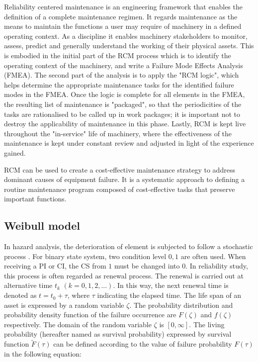 Reliability centered maintenance is an engineering framework that enables the definition of a complete maintenance regimen. It regards maintenance as the means to maintain the functions a user may require of machinery in a defined operating context. As a discipline it enables machinery stakeholders to monitor, assess, predict and generally understand the working of their physical assets. This is embodied in the initial part of the RCM process which is to identify the operating context of the machinery, and write a Failure Mode Effects Analysis (FMEA). The second part of the analysis is to apply the "RCM logic", which helps determine the appropriate maintenance tasks for the identified failure modes in the FMEA. Once the logic is complete for all elements in the FMEA, the resulting list of maintenance is "packaged", so that the periodicities of the tasks are rationalised to be called up in work packages; it is important not to destroy the applicability of maintenance in this phase. Lastly, RCM is kept live throughout the "in-service" life of machinery, where the effectiveness of the maintenance is kept under constant review and adjusted in light of the experience gained.

RCM can be used to create a cost-effective maintenance strategy to address dominant causes of equipment failure. It is a systematic approach to defining a routine maintenance program composed of cost-effective tasks that preserve important functions.









\subsection{Weibull model} \label{ch03:weibullmodel}

In hazard analysis, the deterioration of element is subjected to follow a stochastic process \cite{lancaster90}. For binary state system, two condition level $0, 1$ are often used. When receiving a PI or CI, the CS from $1$ must be changed into $0$. In reliability study, this process is often regarded as renewal process. The renewal is carried out at alternative time $t_k$ $(k=0,1,2,...)$. In this way, the next renewal time is denoted as $t=t_0+\tau$, where $\tau$ indicating the elapsed time. The life span of an asset is expressed by a random variable $\zeta$. The probability distribution and probability density function of the failure occurrence are $F(\zeta)$ and $f(\zeta)$ respectively. The domain of the random variable $\zeta$ is $[0,\infty]$. The living probability (hereafter named as survival probability) expressed by survival function $\tilde{F}(\tau)$ can be defined according to the value of failure probability $F(\tau)$ in the following equation:

